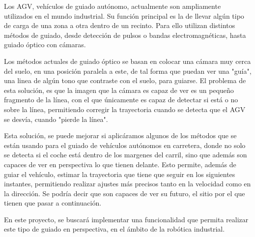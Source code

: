 Los AGV, vehículos de guiado autónomo, actualmente son ampliamente utilizados en el mundo industrial. Su función principal es la de llevar algún tipo de carga de una zona a otra dentro de un recinto. Para ello utilizan distintos métodos de guiado, desde detección de pulsos o bandas electromagnéticas, hasta guiado óptico con cámaras.

Los métodos actuales de guiado óptico se basan en colocar una cámara muy cerca del suelo, en una posición paralela a este, de tal forma que puedan ver una "guía", una linea de algún tono que contraste con el suelo, para guiarse. El problema de esta solución, es que la imagen que la cámara es capaz de ver es un pequeño fragmento de la línea, con el que únicamente es capaz de detectar si está o no sobre la línea, permitiendo corregir la trayectoria cuando se detecta que el AGV se desvía, cuando "pierde la línea".

Esta solución, se puede mejorar si aplicáramos algunos de los métodos que se están usando para el guiado de vehículos autónomos en carretera, donde no solo se detecta si el coche está dentro de los margenes del carril, sino que además son capaces de ver en perspectiva lo que tienen delante. Esto permite, además de guiar el vehículo, estimar la trayectoria que tiene que seguir en los siguientes instantes, permitiendo realizar ajustes más precisos tanto en la velocidad como en la dirección. Se podría decir que son capaces de ver su futuro, el sitio por el que tienen que pasar a continuación.

En este proyecto, se buscará implementar una funcionalidad que permita realizar este tipo de guiado en perspectiva, en el ámbito de la robótica industrial.
